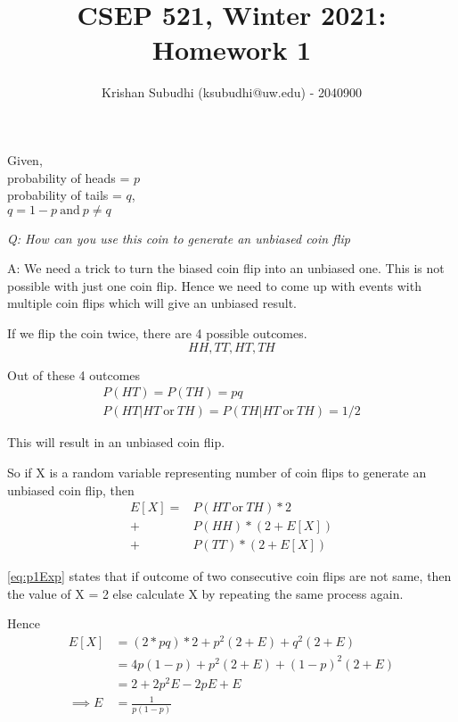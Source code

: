 \documentclass{homeworg}
\title{CSEP 521, Winter 2021: Homework 1}
\author{Krishan Subudhi (ksubudhi@uw.edu) - 2040900}
\begin{document}
\maketitle

\exercise
Given,\\
probability of heads = $p$ \\
probability of tails = $q$,\\
$q = 1 - p \ \text{and}\ p \neq q$

\emph{Q:  How can you use this coin to generate an unbiased coin flip}

A: We need a trick to turn the biased coin flip into an unbiased one. This is not possible with just one coin flip. Hence we need to come up with events with  multiple coin flips which will give an unbiased result.

If we flip the coin twice, there are 4 possible outcomes. 
\[
HH, TT, HT, TH
\]

Out of these 4 outcomes
\begin{align*}
P(HT) = P(TH) = pq\\
P(HT | HT\ \text{or}\ TH) = P(TH | HT\ \text{or}\ TH) = 1/2
\end{align*}


This will result in an unbiased coin flip. 

So if X is a random variable representing number of coin flips to generate an unbiased coin flip, then 
\begin{equation}
\label{eq:p1Exp}
\begin{split}
    E[X]  = & P(HT\ \text{or}\ TH ) \ast 2 \\
    + & P(HH) \ast (2 + E[X]) \\
    + & P(TT) \ast (2 + E[X])
\end{split}
\end{equation}

\ref{eq:p1Exp} states that if outcome of two consecutive coin flips are not same, then the value of X = 2 else calculate X by repeating the same process again.

Hence
\begin{equation}
\begin{split}
    E[X] & = (2 \ast pq) \ast 2 + p^2(2+E) + q^2(2+E) \\
    & = 4 p(1-p) + p^2(2+E) + (1-p)^2(2+E) \\
     & = 2+ 2 p^2E -2pE + E\\
    \implies E & = \frac{1}{p(1-p)}
\end{split}
\end{equation}
\end{document}
